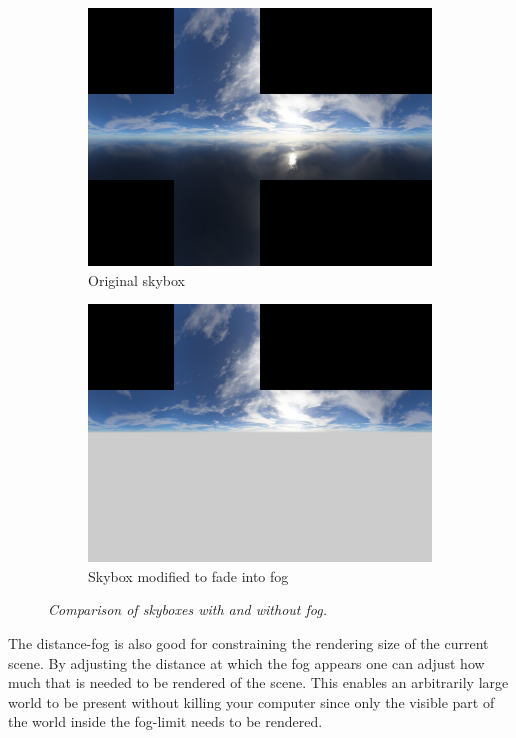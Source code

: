 \begin{figure}[H]
\begin{subfigure}{.5\textwidth}
  \centering
  \includegraphics[width=0.9\linewidth]{images/skybox0.jpg}
  \caption{Original skybox}
  \label{fig:skybox0}
\end{subfigure}%
\begin{subfigure}{.5\textwidth}
  \centering
  \includegraphics[width=0.9\linewidth]{images/skybox1.jpg}
  \caption{Skybox modified to fade into fog}
  \label{fig:skybox1}
\end{subfigure}
\caption[Skybox Fog Comparison]{\textit{Comparison of skyboxes with and without fog.}}
\label{fig:SkyboxComparison}
\end{figure}

The distance-fog is also good for constraining the rendering size of the current scene. By adjusting the distance at which the fog appears one can adjust how much that is needed to be rendered of the scene. This enables an arbitrarily large world to be present without killing your computer since only the visible part of the world inside the fog-limit needs to be rendered. 

